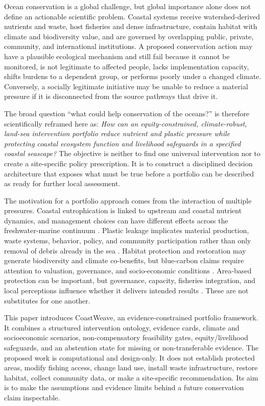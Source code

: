 \documentclass[conference]{IEEEtran}
\newcommand{\coast}{CoastWeave}
\begin{document}
Ocean conservation is a global challenge, but global importance alone does not define an actionable scientific problem. Coastal systems receive watershed-derived nutrients and waste, host fisheries and dense infrastructure, contain habitat with climate and biodiversity value, and are governed by overlapping public, private, community, and international institutions. A proposed conservation action may have a plausible ecological mechanism and still fail because it cannot be monitored, is not legitimate to affected people, lacks implementation capacity, shifts burdens to a dependent group, or performs poorly under a changed climate. Conversely, a socially legitimate initiative may be unable to reduce a material pressure if it is disconnected from the source pathways that drive it.

The broad question ``what could help conservation of the oceans?'' is therefore scientifically reframed here as: \emph{How can an equity-constrained, climate-robust, land-sea intervention portfolio reduce nutrient and plastic pressure while protecting coastal ecosystem function and livelihood safeguards in a specified coastal seascape?} The objective is neither to find one universal intervention nor to create a site-specific policy prescription. It is to construct a disciplined decision architecture that exposes what must be true before a portfolio can be described as ready for further local assessment.

The motivation for a portfolio approach comes from the interaction of multiple pressures. Coastal eutrophication is linked to upstream and coastal nutrient dynamics, and management choices can have different effects across the freshwater-marine continuum \cite{paerl2009,malone2020}. Plastic leakage implicates material production, waste systems, behavior, policy, and community participation rather than only removal of debris already in the sea \cite{kumar2021}. Habitat protection and restoration may generate biodiversity and climate co-benefits, but blue-carbon claims require attention to valuation, governance, and socio-economic conditions \cite{hilmi2021}. Area-based protection can be important, but governance, capacity, fisheries integration, and local perceptions influence whether it delivers intended results \cite{mccay2011,bennett2013,gill2017}. These are not substitutes for one another.

This paper introduces \coast{}, an evidence-constrained portfolio framework. It combines a structured intervention ontology, evidence cards, climate and socioeconomic scenarios, non-compensatory feasibility gates, equity/livelihood safeguards, and an abstention state for missing or non-transferable evidence. The proposed work is computational and design-only. It does not establish protected areas, modify fishing access, change land use, install waste infrastructure, restore habitat, collect community data, or make a site-specific recommendation. Its aim is to make the assumptions and evidence limits behind a future conservation claim inspectable.
\end{document}
